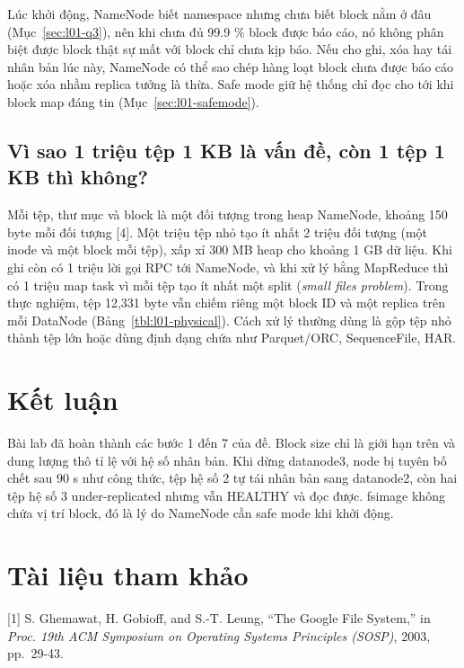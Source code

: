 \documentclass[
  12pt,
  a4paper,
]{report}
\begin{document}
Lúc khởi động, NameNode biết namespace nhưng chưa biết block nằm ở đâu
(Mục~\ref{sec:l01-q3}), nên khi chưa đủ 99.9 \% block được báo cáo, nó
không phân biệt được block thật sự mất với block chỉ chưa kịp báo. Nếu
cho ghi, xóa hay tái nhân bản lúc này, NameNode có thể sao chép hàng
loạt block chưa được báo cáo hoặc xóa nhầm replica tưởng là thừa. Safe
mode giữ hệ thống chỉ đọc cho tới khi block map đáng tin
(Mục~\ref{sec:l01-safemode}).

\subsection{Vì sao 1 triệu tệp 1 KB là vấn đề, còn 1 tệp 1 KB thì
không?}\label{sec:l01-q8}

Mỗi tệp, thư mục và block là một đối tượng trong heap NameNode, khoảng
150 byte mỗi đối tượng {[}4{]}. Một triệu tệp nhỏ tạo ít nhất 2 triệu
đối tượng (một inode và một block mỗi tệp), xấp xỉ 300 MB heap cho
khoảng 1 GB dữ liệu. Khi ghi còn có 1 triệu lời gọi RPC tới NameNode, và
khi xử lý bằng MapReduce thì có 1 triệu map task vì mỗi tệp tạo ít nhất
một split (\emph{small files problem}). Trong thực nghiệm, tệp 12,331
byte vẫn chiếm riêng một block ID và một replica trên mỗi DataNode
(Bảng~\ref{tbl:l01-physical}). Cách xử lý thường dùng là gộp tệp nhỏ
thành tệp lớn hoặc dùng định dạng chứa như Parquet/ORC, SequenceFile,
HAR.

\section{Kết luận}\label{sec:l01-conclusion}

Bài lab đã hoàn thành các bước 1 đến 7 của đề. Block size chỉ là giới
hạn trên và dung lượng thô tỉ lệ với hệ số nhân bản. Khi dừng datanode3,
node bị tuyên bố chết sau 90 s như công thức, tệp hệ số 2 tự tái nhân
bản sang datanode2, còn hai tệp hệ số 3 under-replicated nhưng vẫn
HEALTHY và đọc được. fsimage không chứa vị trí block, đó là lý do
NameNode cần safe mode khi khởi động.

\section*{Tài liệu tham khảo}\label{tuxe0i-liux1ec7u-tham-khux1ea3o}

{[}1{]} S. Ghemawat, H. Gobioff, and S.-T. Leung, ``The Google File
System,'' in \emph{Proc. 19th ACM Symposium on Operating Systems
Principles (SOSP)}, 2003, pp.~29-43.
\end{document}
